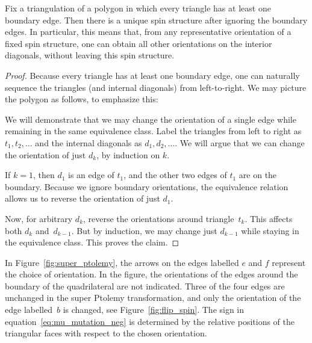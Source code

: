 \begin {Proposition} \label{prop:equiv_rel}
 Fix a triangulation of a polygon in which every triangle has at least one boundary edge. Then there is a unique spin structure after ignoring the boundary edges. In particular, this means that, from any representative orientation of a fixed spin structure, one can obtain all other orientations on the interior diagonals, without leaving this spin structure.
\end {Proposition}
\begin {proof}
 Because every triangle has at least one boundary edge, one can naturally sequence the triangles (and internal diagonals) from left-to-right.
 We may picture the polygon as follows, to emphasize this:
 \begin{center}
 \end{center}
 We will demonstrate that we may change the orientation of a single edge while remaining in the same equivalence class. Label
 the triangles from left to right as $t_1,t_2,\dots$ and the internal diagonals as $d_1,d_2,\dots$. We will argue that we can change
 the orientation of just $d_k$, by induction on $k$.

 If $k=1$, then $d_1$ is an edge of $t_1$, and the other two edges of $t_1$ are on the boundary. Because we ignore boundary orientations,
 the equivalence relation allows us to reverse the orientation of just $d_1$.

 Now, for arbitrary $d_k$, reverse the orientations around triangle~$t_k$. This affects both $d_k$ and~$d_{k-1}$. But by induction, we may
 change just $d_{k-1}$ while staying in the equivalence class. This proves the claim.
\end {proof}

In Figure~\ref{fig:super_ptolemy}, the arrows on the edges labelled $e$ and $f$ represent the choice of orientation. In the figure,
the orientations of the edges around the boundary of the quadrilateral are not indicated. Three of the four edges are unchanged
in the super Ptolemy transformation, and only the orientation of the edge labelled~$b$ is changed, see Figure~\ref{fig:flip_spin}. The sign in equation~\eqref{eq:mu_mutation_neg} is determined by the relative positions of the triangular faces with respect to the chosen orientation.

